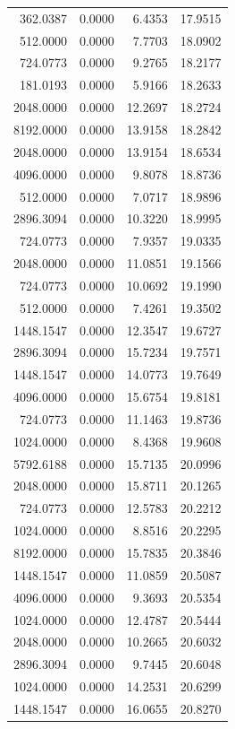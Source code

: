 \begin{tabular}{rrrr}
362.0387 & 0.0000 & 6.4353 & 17.9515 \\
512.0000 & 0.0000 & 7.7703 & 18.0902 \\
724.0773 & 0.0000 & 9.2765 & 18.2177 \\
181.0193 & 0.0000 & 5.9166 & 18.2633 \\
2048.0000 & 0.0000 & 12.2697 & 18.2724 \\
8192.0000 & 0.0000 & 13.9158 & 18.2842 \\
2048.0000 & 0.0000 & 13.9154 & 18.6534 \\
4096.0000 & 0.0000 & 9.8078 & 18.8736 \\
512.0000 & 0.0000 & 7.0717 & 18.9896 \\
2896.3094 & 0.0000 & 10.3220 & 18.9995 \\
724.0773 & 0.0000 & 7.9357 & 19.0335 \\
2048.0000 & 0.0000 & 11.0851 & 19.1566 \\
724.0773 & 0.0000 & 10.0692 & 19.1990 \\
512.0000 & 0.0000 & 7.4261 & 19.3502 \\
1448.1547 & 0.0000 & 12.3547 & 19.6727 \\
2896.3094 & 0.0000 & 15.7234 & 19.7571 \\
1448.1547 & 0.0000 & 14.0773 & 19.7649 \\
4096.0000 & 0.0000 & 15.6754 & 19.8181 \\
724.0773 & 0.0000 & 11.1463 & 19.8736 \\
1024.0000 & 0.0000 & 8.4368 & 19.9608 \\
5792.6188 & 0.0000 & 15.7135 & 20.0996 \\
2048.0000 & 0.0000 & 15.8711 & 20.1265 \\
724.0773 & 0.0000 & 12.5783 & 20.2212 \\
1024.0000 & 0.0000 & 8.8516 & 20.2295 \\
8192.0000 & 0.0000 & 15.7835 & 20.3846 \\
1448.1547 & 0.0000 & 11.0859 & 20.5087 \\
4096.0000 & 0.0000 & 9.3693 & 20.5354 \\
1024.0000 & 0.0000 & 12.4787 & 20.5444 \\
2048.0000 & 0.0000 & 10.2665 & 20.6032 \\
2896.3094 & 0.0000 & 9.7445 & 20.6048 \\
1024.0000 & 0.0000 & 14.2531 & 20.6299 \\
1448.1547 & 0.0000 & 16.0655 & 20.8270 \\

\end{tabular}
